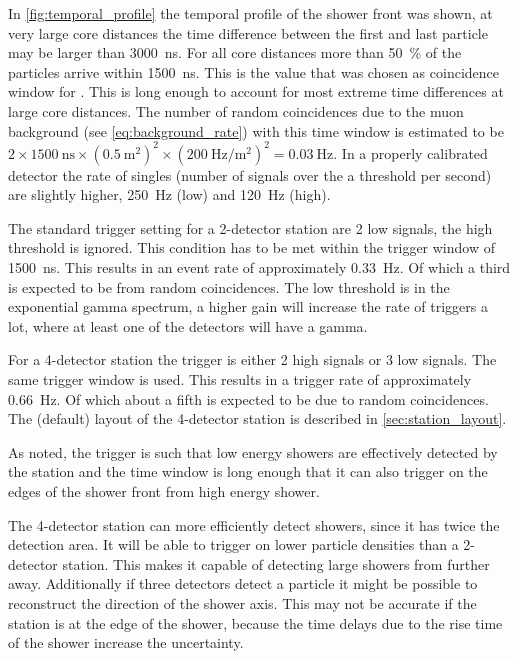 In \cref{fig:temporal_profile} the temporal profile of the shower front was shown, at very large core distances the time difference between the first and last particle may be larger than \SI{3000}{\ns}. For all core distances more than \SI{50}{\percent} of the particles arrive within \SI{1500}{\ns}. This is the value that was chosen as coincidence window for \hisparc. This is long enough to account for most extreme time differences at large core distances. The number of random coincidences due to the muon background (see \cref{eq:background_rate}) with this time window is estimated to be $2 \times \SI{1500}{\ns} \times \left(\SI{0.5}{\meter\squared}\right)^2 \times \left(\SI{200}{\hertz\per\meter\squared}\right)^2 = \SI{0.03}{\hertz}$. In a properly calibrated detector the rate of singles (number of signals over the a threshold per second) are slightly higher, \SI{250}{\hertz} (low) and \SI{120}{\hertz} (high).

The standard trigger setting for a 2-detector station are 2 low signals, the high threshold is ignored. This condition has to be met within the trigger window of \SI{1500}{\ns}. This results in an event rate of approximately \SI{0.33}{\hertz}. Of which a third is expected to be from random coincidences. The low threshold is in the exponential gamma spectrum, a higher \pmt gain will increase the rate of triggers a lot, where at least one of the detectors will have a gamma.

For a 4-detector station the trigger is either 2 high signals or 3 low signals. The same trigger window is used. This results in a trigger rate of approximately \SI{0.66}{\hertz}. Of which about a fifth is expected to be due to random coincidences. The (default) layout of the 4-detector station is described in \cref{sec:station_layout}.

As noted, the trigger is such that low energy showers are effectively detected by the station and the time window is long enough that it can also trigger on the edges of the shower front from high energy shower.

The 4-detector station can more efficiently detect showers, since it has twice the detection area. It will be able to trigger on lower particle densities than a 2-detector station. This makes it capable of detecting large showers from further away. Additionally if three detectors detect a particle it might be possible to reconstruct the direction of the shower axis. This may not be accurate if the station is at the edge of the shower, because the time delays due to the rise time of the shower increase the uncertainty.

